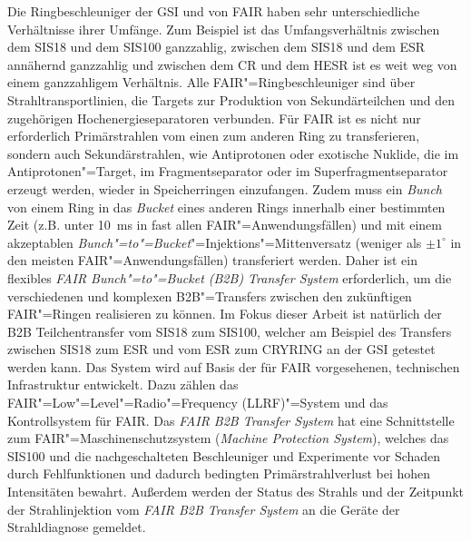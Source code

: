 Die Ringbeschleuniger der GSI und von FAIR haben sehr unterschiedliche Verh\"altnisse ihrer Umf\"ange. Zum Beispiel ist das Umfangsverh\"altnis zwischen dem SIS18 und dem SIS100 ganzzahlig, zwischen dem SIS18 und dem ESR ann\"ahernd ganzzahlig und zwischen dem CR und dem HESR ist es weit weg von einem ganzzahligem Verh\"altnis. Alle FAIR"=Ringbeschleuniger sind \"uber Strahltransportlinien, die Targets zur Produktion von Sekund\"arteilchen und den zugeh\"origen Hochenergieseparatoren verbunden. F\"ur FAIR ist es nicht nur erforderlich Prim\"arstrahlen vom einen zum anderen Ring zu transferieren, sondern auch Sekund\"arstrahlen, wie Antiprotonen oder exotische Nuklide, die im Antiprotonen"=Target, im Fragmentseparator oder im Superfragmentseparator erzeugt werden, wieder in Speicherringen einzufangen. Zudem muss ein \textit{Bunch} von einem Ring in das \textit{Bucket} eines anderen Rings innerhalb einer bestimmten Zeit (z.B. unter \SI{10}{\ms} in fast allen FAIR"=Anwendungsf\"allen) und mit einem akzeptablen \textit{Bunch"=to"=Bucket}"=Injektions"=Mittenversatz (weniger als $\pm1^\circ$ in den meisten FAIR"=Anwendungsf\"allen) transferiert werden. Daher ist ein flexibles \textit{FAIR Bunch"=to"=Bucket (B2B) Transfer System} erforderlich, um die verschiedenen und komplexen B2B"=Transfers zwischen den zuk\"unftigen FAIR"=Ringen realisieren zu k\"onnen. Im Fokus dieser Arbeit ist nat\"urlich der B2B Teilchentransfer vom SIS18 zum SIS100, welcher am Beispiel des Transfers zwischen SIS18 zum ESR und vom ESR zum CRYRING an der GSI getestet werden kann. Das System wird auf Basis der f\"ur FAIR vorgesehenen, technischen Infrastruktur entwickelt. Dazu z\"ahlen das FAIR"=Low"=Level"=Radio"=Frequency (LLRF)"=System und das Kontrollsystem f\"ur FAIR. Das \textit{FAIR B2B Transfer System} hat eine Schnittstelle zum FAIR"=Maschinenschutzsystem (\textit{Machine Protection System}), welches das SIS100 und die nachgeschalteten Beschleuniger und Experimente vor Schaden durch Fehlfunktionen und dadurch bedingten Prim\"arstrahlverlust bei hohen Intensit\"aten bewahrt. Au\ss{}erdem werden der Status des Strahls und der Zeitpunkt der Strahlinjektion vom \textit{FAIR B2B Transfer System} an die Ger\"ate der Strahldiagnose gemeldet.


